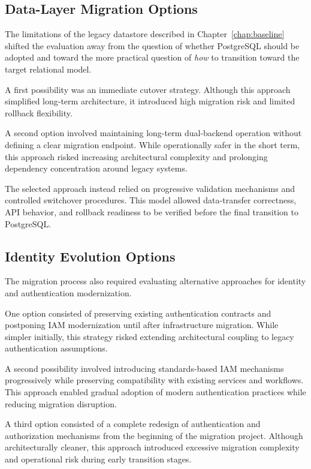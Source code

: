 \subsection{Data-Layer Migration Options}
\label{sec:data-layer-options}
The limitations of the legacy datastore described in Chapter~\ref{chap:baseline} shifted the evaluation away from the question of whether PostgreSQL should be adopted and toward the more practical question of \emph{how} to transition toward the target relational model.

A first possibility was an immediate cutover strategy. Although this approach simplified long-term architecture, it introduced high migration risk and limited rollback flexibility.

A second option involved maintaining long-term dual-backend operation without defining a clear migration endpoint. While operationally safer in the short term, this approach risked increasing architectural complexity and prolonging dependency concentration around legacy systems.

The selected approach instead relied on progressive validation mechanisms and controlled switchover procedures. This model allowed data-transfer correctness, API behavior, and rollback readiness to be verified before the final transition to PostgreSQL.

\subsection{Identity Evolution Options}
The migration process also required evaluating alternative approaches for identity and authentication modernization.

One option consisted of preserving existing authentication contracts and postponing IAM modernization until after infrastructure migration. While simpler initially, this strategy risked extending architectural coupling to legacy authentication assumptions.

A second possibility involved introducing standards-based IAM mechanisms progressively while preserving compatibility with existing services and workflows. This approach enabled gradual adoption of modern authentication practices while reducing migration disruption.

A third option consisted of a complete redesign of authentication and authorization mechanisms from the beginning of the migration project. Although architecturally cleaner, this approach introduced excessive migration complexity and operational risk during early transition stages.

